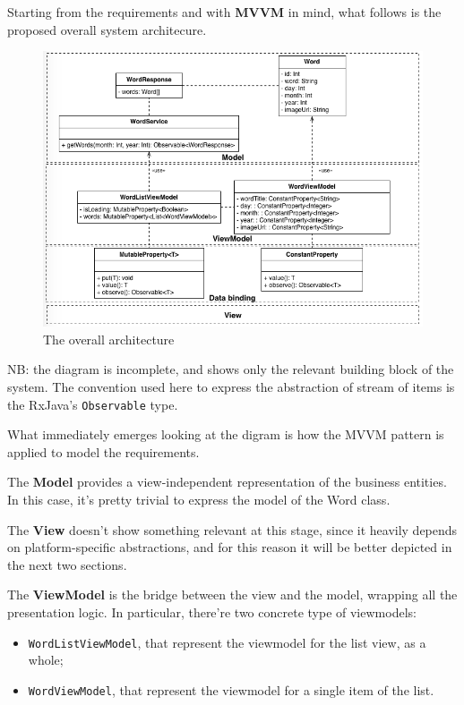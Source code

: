 Starting from the requirements and with \textbf{MVVM} in mind, what
follows is the proposed overall system architecure.

\begin{figure}[htbp]
\centering
\includegraphics[scale=0.5]{imgs/common_arch.png}
\caption{The overall architecture}
\end{figure}

NB: the diagram is incomplete, and shows only the relevant building
block of the system. The convention used here to express the abstraction
of stream of items is the RxJava's \texttt{Observable} type.

What immediately emerges looking at the digram is how the MVVM pattern
is applied to model the requirements.

The \textbf{Model} provides a view-independent representation of the
business entities. In this case, it's pretty trivial to express the
model of the Word class.

The \textbf{View} doesn't show something relevant at this stage, since
it heavily depends on platform-specific abstractions, and for this
reason it will be better depicted in the next two sections.

The \textbf{ViewModel} is the bridge between the view and the model,
wrapping all the presentation logic. In particular, there're two
concrete type of viewmodels:

\begin{itemize}
\itemsep1pt\parskip0pt
\item
  \texttt{WordListViewModel}, that represent the viewmodel for the list
  view, as a whole;
\item
  \texttt{WordViewModel}, that represent the viewmodel for a single item
  of the list.
\end{itemize}

